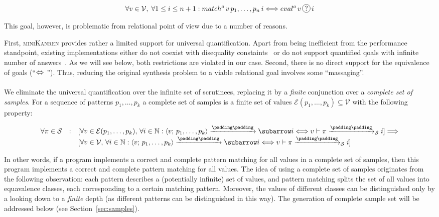 \[
\forall v\in \mathcal V,\; \forall 1\le i\le n+1 : match^o\,v\,p_1,\dots,p_n\,i\Longleftrightarrow eval^o\,v\,\circled{?}\,i
\]

This goal, however, is problematic from relational point of view due to a number of reasons.

First, \textsc{miniKanren} provides rather a limited support for universal quantification. Apart from being inefficient from
the performance standpoint, existing implementations either do not coexist with disequality constaints~\cite{eigen}
or do not support quantified qoals with infinite number of answers~\cite{moiseenko}. As we will see below, both restrictions are
violated in our case. Second, there is no direct support for the equivalence of goals (``$\xLeftrightarrow{}{}$''). Thus,
reducing the original synthesis problem to a viable relational goal involves some ``massaging''.

We eliminate the universal quantification over the infinite set of scrutinees, replacing it by a \emph{finite}
conjunction over a \emph{complete set of samples}. For a sequence of patterns $p_1,\dots,p_k$ a
complete set of samples is a finite set of values $\mathcal{E}(p_1,\dots,p_k)\subseteq\mathcal{V}$ with the following
property:

\[
\setarrow{\xrightarrow}
\begin{array}{rcl}
  \forall\pi\in\mathcal S & : & [\forall v\in\mathcal{E}(p_1,\dots,p_k),\,\forall i\in\mathbb{N} : \trans{\inbr{v;\,p_1,\dots,p_k}}{}{i} \Longleftrightarrow {\setsubarrow{_{\mathcal S}}\withenv{v}{\trans{\pi}{}{i}}}] \Longrightarrow \\
                          &   & [\forall v\in\mathcal V,\,\forall i\in\mathbb{N} : \trans{\inbr{v;\,p_1,\dots,p_k}}{}{i} \Longleftrightarrow  {\setsubarrow{_{\mathcal S}}\withenv{v}{\trans{\pi}{}{i}}}]
\end{array}
\]

In other words, if a program implements a correct and complete pattern matching for all values in a complete set of samples, then this
program implements a correct and complete pattern matching for all values. The idea of using a complete set of samples originates from the following observation: each pattern
describes a (potentially infinite) set of values, and pattern matching splits the set of all values into equavalence classes, each corresponding to a certain matching pattern.
Moreover, the values of different classes can be distinguished only by a looking down to a \emph{finite} depth (as different patterns can be distinguished in this way).
The generation of complete sample set will be addressed below (see Section~\ref{sec:samples}).

